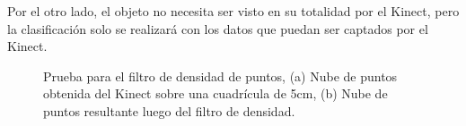 	 Por el otro lado, el objeto no necesita ser visto en su totalidad por el Kinect, pero la clasificación solo se realizará con los datos que puedan ser captados por el Kinect.\\
	 
	
	\begin{figure}[!htb]
		\centering
		\caption[Prueba para el filtro de densidad de puntos.]{Prueba para el filtro de densidad de puntos, (a) Nube de puntos obtenida del Kinect sobre una cuadrícula de 5cm, (b) Nube de puntos resultante luego del filtro de densidad.}
			\label{fig:coutPoints}
	\end{figure}

%
	
